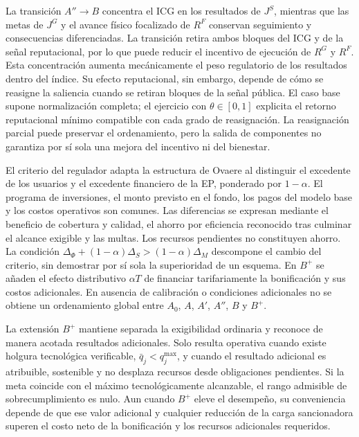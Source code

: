 La transición \(A''\to B\) concentra el ICG en los resultados de \(J^{S}\), mientras que las metas de \(J^{G}\) y el avance físico focalizado de \(R^{F}\) conservan seguimiento y consecuencias diferenciadas. La transición retira ambos bloques del ICG y de la señal reputacional, por lo que puede reducir el incentivo de ejecución de \(R^G\) y \(R^F\). Esta concentración aumenta mecánicamente el peso regulatorio de los resultados dentro del índice. Su efecto reputacional, sin embargo, depende de cómo se reasigne la saliencia cuando se retiran bloques de la señal pública. El caso base supone normalización completa; el ejercicio con \(\theta\in[0,1]\) explicita el retorno reputacional mínimo compatible con cada grado de reasignación. La reasignación parcial puede preservar el ordenamiento, pero la salida de componentes no garantiza por sí sola una mejora del incentivo ni del bienestar.

El criterio del regulador adapta la estructura de Ovaere al distinguir el excedente de los usuarios y el excedente financiero de la EP, ponderado por \(1-\alpha\). El programa de inversiones, el monto previsto en el fondo, los pagos del modelo base y los costos operativos son comunes. Las diferencias se expresan mediante el beneficio de cobertura y calidad, el ahorro por eficiencia reconocido tras culminar el alcance exigible y las multas. Los recursos pendientes no constituyen ahorro. La condición \(\Delta_\Phi+(1-\alpha)\Delta_S>(1-\alpha)\Delta_M\) descompone el cambio del criterio, sin demostrar por sí sola la superioridad de un esquema. En \(B^+\) se añaden el efecto distributivo \(\alpha T\) de financiar tarifariamente la bonificación y sus costos adicionales. En ausencia de calibración o condiciones adicionales no se obtiene un ordenamiento global entre \(A_0\), \(A\), \(A'\), \(A''\), \(B\) y \(B^+\).

La extensión \(B^{+}\) mantiene separada la exigibilidad ordinaria y reconoce de manera acotada resultados adicionales. Solo resulta operativa cuando existe holgura tecnológica verificable, \(\bar q_j<q_j^{\max}\), y cuando el resultado adicional es atribuible, sostenible y no desplaza recursos desde obligaciones pendientes. Si la meta coincide con el máximo tecnológicamente alcanzable, el rango admisible de sobrecumplimiento es nulo. Aun cuando \(B^{+}\) eleve el desempeño, su conveniencia depende de que ese valor adicional y cualquier reducción de la carga sancionadora superen el costo neto de la bonificación y los recursos adicionales requeridos.


